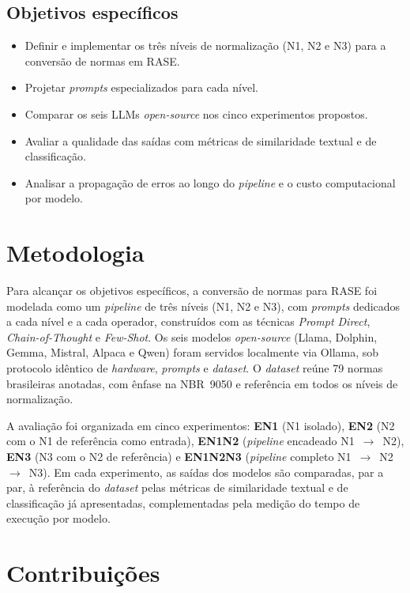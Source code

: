 \subsection*{Objetivos específicos}

\begin{itemize}
    \item Definir e implementar os três níveis de normalização (N1, N2 e N3) para a conversão de normas em RASE.
    \item Projetar \textit{prompts} especializados para cada nível.
    \item Comparar os seis LLMs \textit{open-source} nos cinco experimentos propostos.
    \item Avaliar a qualidade das saídas com métricas de similaridade textual e de classificação.
    \item Analisar a propagação de erros ao longo do \textit{pipeline} e o custo computacional por modelo.
\end{itemize}


\section{Metodologia}

Para alcançar os objetivos específicos, a conversão de normas para RASE foi modelada como um \textit{pipeline} de três níveis (N1, N2 e N3), com \textit{prompts} dedicados a cada nível e a cada operador, construídos com as técnicas \textit{Prompt Direct}, \textit{Chain-of-Thought} e \textit{Few-Shot}. Os seis modelos \textit{open-source} (Llama, Dolphin, Gemma, Mistral, Alpaca e Qwen) foram servidos localmente via Ollama, sob protocolo idêntico de \textit{hardware}, \textit{prompts} e \textit{dataset}. O \textit{dataset} reúne 79 normas brasileiras anotadas, com ênfase na NBR~9050 e referência em todos os níveis de normalização.

A avaliação foi organizada em cinco experimentos: \textbf{EN1} (N1 isolado), \textbf{EN2} (N2 com o N1 de referência como entrada), \textbf{EN1N2} (\textit{pipeline} encadeado N1~$\rightarrow$~N2), \textbf{EN3} (N3 com o N2 de referência) e \textbf{EN1N2N3} (\textit{pipeline} completo N1~$\rightarrow$~N2~$\rightarrow$~N3). Em cada experimento, as saídas dos modelos são comparadas, par a par, à referência do \textit{dataset} pelas métricas de similaridade textual e de classificação já apresentadas, complementadas pela medição do tempo de execução por modelo.


\section{Contribuições}

